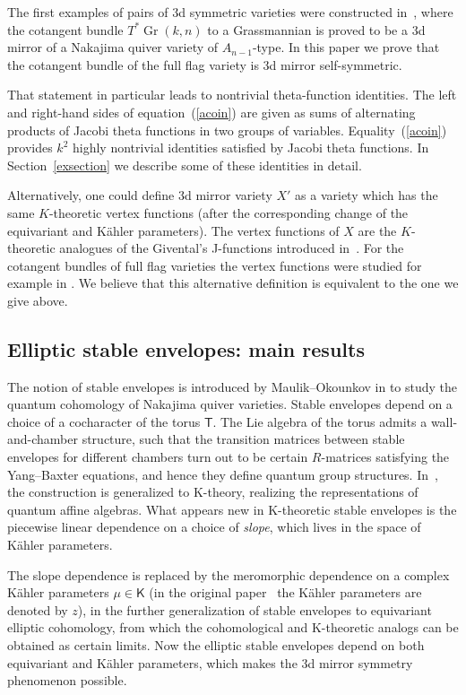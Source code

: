 \documentclass[10pt,a4paper]{amsart}
\DeclareMathOperator\Gr{Gr}
\newcommand{\bK}{\mathsf{K}}
\newcommand{\bT}{\mathsf{T}}
\numberwithin{equation}{section}
\begin{document}
The first examples of pairs of 3d symmetric varieties were constructed in~\cite{RVSZ}, where the cotangent bundle $T^*\Gr(k,n)$ to a Grassmannian is proved to be
a 3d mirror of a Nakajima quiver variety of $A_{n-1}$-type. In this paper we prove that the cotangent bundle of the full flag variety is 3d mirror self-symmetric.

That statement in particular leads to nontrivial theta-function identities. The left and right-hand sides of equation~(\ref{acoin}) are given as sums of alternating products of Jacobi theta functions in two groups of variables. Equality~(\ref{acoin}) provides $k^2$ highly nontrivial identities satisfied by Jacobi theta functions. In Section~\ref{exsection} we describe some of these identities in detail.

Alternatively, one could define 3d mirror variety $X'$ as a variety which has the same $K$-theoretic vertex functions (after the corresponding change of the equivariant and K\"ahler para\-me\-ters). The vertex functions of $X$ are the $K$-theoretic analogues of the Givental's J-functions introduced in~\cite{pcmilec}. For the cotangent bundles of full flag varieties the vertex functions were studied for example in \cite{Korot1,Kor2,Push2}. We believe that this alternative definition is equivalent to the one we give above.

\subsection{Elliptic stable envelopes: main results}

The notion of stable envelopes is introduced by Maulik--Okounkov in \cite{MO} to study the quantum cohomology of Nakajima quiver varieties. Stable envelopes depend on a choice of a cocharacter of the torus $\bT$. The Lie algebra of the torus admits a wall-and-chamber structure, such that the transition matrices between stable envelopes for different chambers turn out to be certain $R$-matrices satisfying the Yang--Baxter equations, and hence they define quantum group structures. In~\cite{pcmilec, OS}, the construction is generalized to K-theory, realizing the representations of quantum affine algebras. What appears new in K-theoretic stable envelopes is the piecewise linear dependence on a choice of \emph{slope}, which lives in the space of K\"ahler parameters.

The slope dependence is replaced by the meromorphic dependence on a complex K\"ahler parameters $\mu \in \bK$ (in the original paper~\cite{AOelliptic} the K\"ahler parameters are denoted by $z$), in the further generalization of stable envelopes to equivariant elliptic cohomology, from which the cohomological and K-theoretic analogs can be obtained as certain limits. Now the elliptic stable envelopes depend on both equivariant and K\"ahler parameters, which makes the 3d mirror symmetry phenomenon possible.
\end{document}
